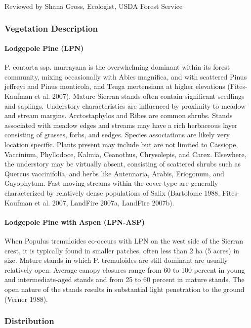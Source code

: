 Reviewed by Shana Gross, Ecologist, USDA Forest Service

\subsubsection{Vegetation Description}
\paragraph{Lodgepole Pine (LPN)}	P. contorta ssp. murrayana is the overwhelming dominant within its forest community, mixing occasionally with Abies magnifica, and with scattered Pinus jeffreyi  and Pinus monticola, and Tsuga mertensiana at higher elevations (Fites-Kaufman et al. 2007). Mature Sierran stands often contain significant seedlings and saplings. Understory characteristics are influenced by proximity to meadow and stream margins. Arctostaphylos and Ribes are common shrubs. Stands associated with meadow edges and streams may have a rich herbaceous layer consisting of grasses, forbs, and sedges. Species associations are likely very location specific. Plants present may include but are not limited to Cassiope, Vaccinium, Phyllodoce, Kalmia, Ceanothus, Chrysolepis, and Carex. Elsewhere, the understory may be virtually absent, consisting of scattered shrubs such as Quercus vaccinifolia, and herbs like Antennaria, Arabis, Eriogonum, and Gayophytum. Fast-moving streams within the cover type are generally characterized by relatively dense populations of Salix (Bartolome 1988, Fites-Kaufman et al. 2007, LandFire 2007a, LandFire 2007b).  

\paragraph{Lodgepole Pine with Aspen (LPN-ASP)}	When Populus tremuloides co-occurs with LPN on the west side of the Sierran crest, it is typically found in smaller patches, often less than 2 ha (5 acres) in size. Mature stands in which P. tremuloides are still dominant are usually relatively open. Average canopy closures range from 60 to 100 percent in young and intermediate-aged stands and from 25 to 60 percent in mature stands. The open nature of the stands results in substantial light penetration to the ground (Verner 1988).

\subsubsection{Distribution}
